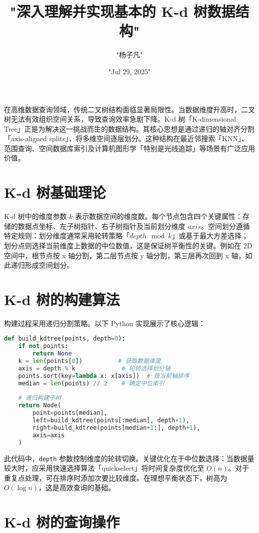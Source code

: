 \title{"深入理解并实现基本的 K-d 树数据结构"}
\author{"杨子凡"}
\date{"Jul 29, 2025"}
\maketitle
在高维数据查询领域，传统二叉树结构面临显著局限性。当数据维度升高时，二叉树无法有效组织空间关系，导致查询效率急剧下降。K-d 树「K-dimensional Tree」正是为解决这一挑战而生的数据结构。其核心思想是通过递归的轴对齐分割「axis-aligned splits」，将多维空间逐层划分。这种结构在最近邻搜索「KNN」、范围查询、空间数据库索引及计算机图形学「特别是光线追踪」等场景有广泛应用价值。\par
\chapter{K-d 树基础理论}
K-d 树中的维度参数 $k$ 表示数据空间的维度数。每个节点包含四个关键属性：存储的数据点坐标、左子树指针、右子树指针及当前划分维度 $axis$。空间划分遵循特定规则：划分维度通常采用轮转策略「$depth \mod k$」或基于最大方差选择；划分点则选择当前维度上数据的中位数值，这是保证树平衡性的关键。例如在 2D 空间中，根节点按 x 轴分割，第二层节点按 y 轴分割，第三层再次回到 x 轴，如此递归形成空间划分。\par
\chapter{K-d 树的构建算法}
构建过程采用递归分割策略。以下 Python 实现展示了核心逻辑：\par
\begin{lstlisting}[language=python]
def build_kdtree(points, depth=0):
    if not points: 
        return None
    k = len(points[0])          # 获取数据维度
    axis = depth % k             # 轮转选择划分轴
    points.sort(key=lambda x: x[axis])  # 按当前轴排序
    median = len(points) // 2    # 确定中位索引
    
    # 递归构建子树
    return Node(
        point=points[median],
        left=build_kdtree(points[:median], depth+1),
        right=build_kdtree(points[median+1:], depth+1),
        axis=axis
    )
\end{lstlisting}
此代码中，\texttt{depth} 参数控制维度的轮转切换。关键优化在于中位数选择：当数据量较大时，应采用快速选择算法「quickselect」将时间复杂度优化至 $O(n)$。对于重复点处理，可在排序时添加次要比较维度。在理想平衡状态下，树高为 $O(\log n)$，这是高效查询的基础。\par
\chapter{K-d 树的查询操作}
